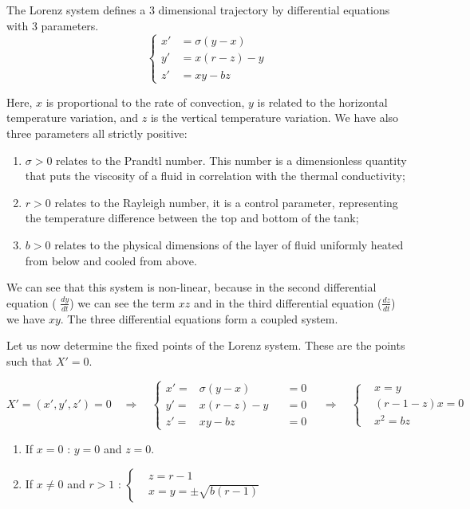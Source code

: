 \documentclass[12pt]{article}
\begin{document}
	\noindent The Lorenz system defines a 3 dimensional trajectory by differential equations with 3 parameters.
	$$
	\begin{cases}
		
		x'&=\sigma(y-x) \\
		y'&=x(r-z)-y \\
		z'&=xy-bz
		
	\end{cases}
	$$
	
	\noindent Here, $x$ is proportional to the rate of convection, $y$ is related to the horizontal temperature variation, and $z$ is the vertical temperature variation.
	We have also three parameters all strictly positive:
	\begin{enumerate}[label=\textbullet]
		\item $\sigma > 0$  relates to the Prandtl number. This number is a dimensionless quantity that puts the viscosity of a fluid in correlation with the thermal conductivity;
		\item $r > 0$  relates to the Rayleigh number, it is a control parameter, representing the temperature difference between the top and bottom of the tank;
		\item $b > 0$ relates to the physical dimensions of the layer of fluid uniformly heated from below and cooled from above.
	\end{enumerate}
	
	\noindent We can see that this system is non-linear, because in the second differential equation ( $\frac{dy}{dt}$) we can see the term $xz$ and in the third differential equation ($\frac{dz}{dt}$) we have $xy$. The three differential equations form a coupled system. 
	
	\noindent Let us now determine the fixed points of the Lorenz system. These are the points such that $X'=0$. 
	
	$$
	X'=(x',y',z')=0
	\quad \Rightarrow \quad 
	\left\{\begin{aligned}
		x'=&\sigma(y-x) &&=0 \\
		y'=&x(r-z)-y  &&=0\\
		z'=&xy-bz &&=0
	\end{aligned}\right. 
	\quad \Rightarrow \quad 
	\left\{\begin{aligned}
		&x=y \\
		&(r-1-z)x=0\\
		&x^2=bz
	\end{aligned}\right.
	$$
	
	\begin{enumerate}[label=\textbullet]
		\item If $x=0$ : \quad  $y=0$ and $z=0$.
		\item If $x\ne 0$ and $r>1$ : \quad $\left\{\begin{aligned}
			&z=r-1\\
			&x=y=\pm\sqrt{b(r-1)}
		\end{aligned}\right.
		$
	\end{enumerate}
	
\end{document}
